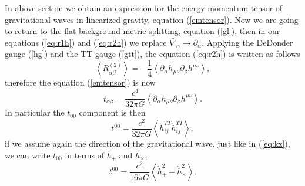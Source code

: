 In above section we obtain an expression for the energy-momentum
tensor of gravitational waves in linearized gravity, equation (\ref{emtensor}).
Now we are going to return to the flat background metric splitting,
equation (\ref{gl}), then in our equations (\ref{eq:r1h}) and (\ref{eq:r2h})
we replace $\bar{\nabla}_{\alpha}\rightarrow\partial_{\alpha}$. Applying
the DeDonder gauge (\ref{hg}) and the TT gauge (\ref{gtt}), the
equation (\ref{eq:r2h}) is written as follows
\[
\left\langle R_{\alpha\beta}^{(2)}\right\rangle =-\frac{1}{4}\left\langle \partial_{\alpha}h_{\mu\nu}\partial_{\beta}h^{\mu\nu}\right\rangle ,
\]
therefore the equation (\ref{emtensor}) is now
\[
t_{\alpha\beta}=\frac{c^{4}}{32\pi G}\left\langle \partial_{\alpha}h_{\mu\nu}\partial_{\beta}h^{\mu\nu}\right\rangle .
\]
In particular the $t_{00}$ component is then
\[
t^{00}=\frac{c^{2}}{32\pi G}\left\langle \dot{h}_{ij}^{TT}\dot{h}_{ij}^{TT}\right\rangle ,
\]
if we assume again the direction of the gravitational wave, just like
in (\ref{eq:kz}), we can write $t_{00}$ in terms of $h_{+}$ and
$h_{\times}$,
\[
t^{00}=\frac{c^{2}}{16\pi G}\left\langle \dot{h}_{+}^{2}+\dot{h}_{\times}^{2}\right\rangle .
\]

